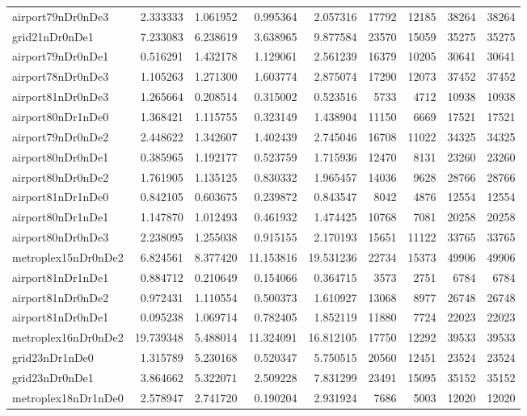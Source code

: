 \begin{longtable}{|l|r|r|r|r|r|r|r|r|}
airport79nDr0nDe3 & 2.333333 & 1.061952 & 0.995364 & 2.057316 & 17792 & 12185 & 38264 & 38264 \\
grid21nDr0nDe1 & 7.233083 & 6.238619 & 3.638965 & 9.877584 & 23570 & 15059 & 35275 & 35275 \\
airport79nDr0nDe1 & 0.516291 & 1.432178 & 1.129061 & 2.561239 & 16379 & 10205 & 30641 & 30641 \\
airport78nDr0nDe3 & 1.105263 & 1.271300 & 1.603774 & 2.875074 & 17290 & 12073 & 37452 & 37452 \\
airport81nDr0nDe3 & 1.265664 & 0.208514 & 0.315002 & 0.523516 & 5733 & 4712 & 10938 & 10938 \\
airport80nDr1nDe0 & 1.368421 & 1.115755 & 0.323149 & 1.438904 & 11150 & 6669 & 17521 & 17521 \\
airport79nDr0nDe2 & 2.448622 & 1.342607 & 1.402439 & 2.745046 & 16708 & 11022 & 34325 & 34325 \\
airport80nDr0nDe1 & 0.385965 & 1.192177 & 0.523759 & 1.715936 & 12470 & 8131 & 23260 & 23260 \\
airport80nDr0nDe2 & 1.761905 & 1.135125 & 0.830332 & 1.965457 & 14036 & 9628 & 28766 & 28766 \\
airport81nDr1nDe0 & 0.842105 & 0.603675 & 0.239872 & 0.843547 & 8042 & 4876 & 12554 & 12554 \\
airport80nDr1nDe1 & 1.147870 & 1.012493 & 0.461932 & 1.474425 & 10768 & 7081 & 20258 & 20258 \\
airport80nDr0nDe3 & 2.238095 & 1.255038 & 0.915155 & 2.170193 & 15651 & 11122 & 33765 & 33765 \\
metroplex15nDr0nDe2 & 6.824561 & 8.377420 & 11.153816 & 19.531236 & 22734 & 15373 & 49906 & 49906 \\
airport81nDr1nDe1 & 0.884712 & 0.210649 & 0.154066 & 0.364715 & 3573 & 2751 & 6784 & 6784 \\
airport81nDr0nDe2 & 0.972431 & 1.110554 & 0.500373 & 1.610927 & 13068 & 8977 & 26748 & 26748 \\
airport81nDr0nDe1 & 0.095238 & 1.069714 & 0.782405 & 1.852119 & 11880 & 7724 & 22023 & 22023 \\
metroplex16nDr0nDe2 & 19.739348 & 5.488014 & 11.324091 & 16.812105 & 17750 & 12292 & 39533 & 39533 \\
grid23nDr1nDe0 & 1.315789 & 5.230168 & 0.520347 & 5.750515 & 20560 & 12451 & 23524 & 23524 \\
grid23nDr0nDe1 & 3.864662 & 5.322071 & 2.509228 & 7.831299 & 23491 & 15095 & 35152 & 35152 \\
metroplex18nDr1nDe0 & 2.578947 & 2.741720 & 0.190204 & 2.931924 & 7686 & 5003 & 12020 & 12020 \\

\end{longtable}
